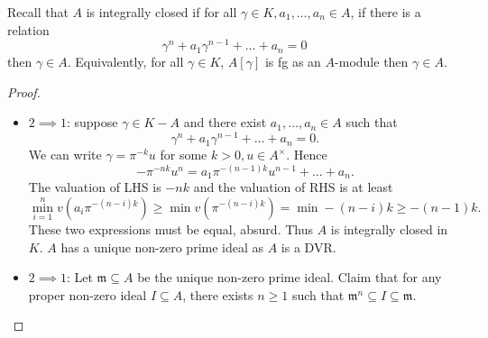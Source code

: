 \documentclass[a4paper]{article}
\begin{document}
Recall that \(A\) is integrally closed if for all \(\gamma \in K, a_1, \dots, a_n \in A\), if
there is a relation
\[
  \gamma^n + a_1 \gamma^{n - 1} + \dots + a_n = 0
\]
then \(\gamma \in A\). Equivalently, for all \(\gamma \in K\), \(A[\gamma]\) is fg as an \(A\)-module then \(\gamma \in A\).

\begin{proof}\leavevmode
  \begin{itemize}
  \item \(2 \implies 1\): suppose \(\gamma \in K - A\) and there exist \(a_1, \dots, a_n \in A\) such that
    \[
      \gamma^n + a_1 \gamma^{n - 1} + \dots + a_n = 0.
    \]
    We can write \(\gamma = \pi^{-k} u\) for some \(k > 0, u \in A^\times\). Hence
    \[
      -\pi^{-nk} u^n = a_1 \pi^{-(n - 1)k} u^{n - 1} + \dots + a_n.
    \]
    The valuation of LHS is \(-nk\) and the valuation of RHS is at least
    \[
      \min_{i = 1}^n v(a_i \pi^{- (n - i) k}) \geq \min v(\pi^{-(n - i)k}) = \min -(n - i) k \geq -(n - 1) k.
    \]
    These two expressions must be equal, absurd. Thus \(A\) is integrally closed in \(K\). \(A\) has a unique non-zero prime ideal as \(A\) is a DVR.
  \item \(2 \implies 1\): Let \(\mathfrak m \subseteq A\) be the unique non-zero prime ideal. Claim that for any proper non-zero ideal \(I \subseteq A\), there exists \(n \geq 1\) such that \(\mathfrak m^n \subseteq I \subseteq \mathfrak m\).


\end{itemize}
\end{proof}
\end{document}
